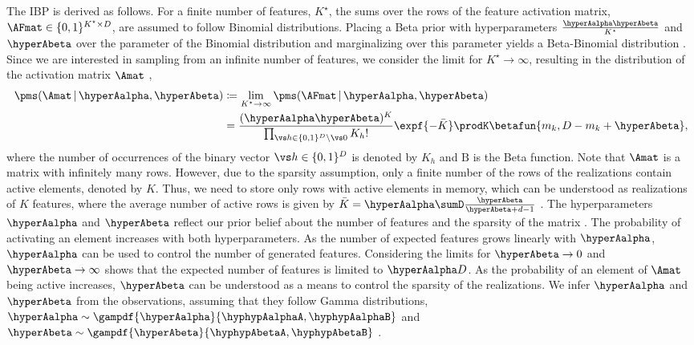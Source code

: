 \documentclass{article}
\begin{document}
The \ac{IBP} is derived as follows.
For a finite number of features, $K^\star$, the sums over the rows of the feature activation matrix, $\AFmat \in \{0,1\}^{K^\star \times D}$, are assumed to follow \iid Binomial distributions.
Placing a Beta prior with hyperparameters $\frac{\hyperAalpha \hyperAbeta}{K^\star}$ and $\hyperAbeta$ over the parameter of the Binomial distribution and marginalizing over this parameter yields a Beta-Binomial distribution \cite{Ghahramani2005, Ghahramani2007}.
Since we are interested in sampling from an infinite number of features, we consider the limit for $K^\star \rightarrow \infty$, resulting in the distribution of the activation matrix $\Amat$ \cite{Ghahramani2005,Ghahramani2007}, 
\begin{align}
 \begin{split}
 \pms(\Amat\,|\,\hyperAalpha,\hyperAbeta) &\coloneqq \lim_{K^\star \rightarrow \infty} \pms(\AFmat\,|\,\hyperAalpha,\hyperAbeta)
 \\ & = \frac{(\hyperAalpha \hyperAbeta)^{K}}{\prod_{\vs h \in \{0,1\}^D \backslash \vs 0} K_h!} \expf{-\bar{K}}
   \prodK \betafun{m_k, D - m_k + \hyperAbeta}, 
 \end{split}
 \label{eq::ibp::infinitemodel}
\end{align}
where the number of occurrences of the binary vector $\vs h \in \{0,1\}^D$ is denoted by $K_h$ and $\text{B}$ is the Beta function.
Note that $\Amat$ is a matrix with infinitely many rows. However, due to the sparsity assumption, only a finite number of the rows of the realizations contain active elements, denoted by $K$. Thus, we need to store only rows with active elements in memory, which can be understood as realizations of $K$ features, where
the average number of active rows is given by $\bar{K} = \hyperAalpha \sumD \frac{\hyperAbeta}{\hyperAbeta + d -1}$ \cite{Ghahramani2005, Doshi-Velez2009}. 
The hyperparameters $\hyperAalpha$ and $\hyperAbeta$ reflect our prior belief about the number of features and the sparsity of the matrix \cite{Ghahramani2007}.
The probability of activating an element increases with both hyperparameters.
As the number of expected features grows linearly with $\hyperAalpha$, $\hyperAalpha$ can be used to control the number of generated features. 
Considering the limits for $\hyperAbeta \rightarrow 0$ and $\hyperAbeta \rightarrow \infty$ shows that the expected number of features is limited to $\hyperAalpha D$. As the probability of an element of $\Amat$ being active increases, $\hyperAbeta$ can be understood as a means to control the sparsity of the realizations. 
We infer $\hyperAalpha$ and $\hyperAbeta$ from the observations, assuming that they follow Gamma distributions, \ie \mbox{$\hyperAalpha \sim \gampdf{\hyperAalpha}{\hyphypAalphaA, \hyphypAalphaB}$} and \mbox{$\hyperAbeta \sim \gampdf{\hyperAbeta}{\hyphypAbetaA, \hyphypAbetaB}$} \cite{Knowles2011}.
\end{document}
